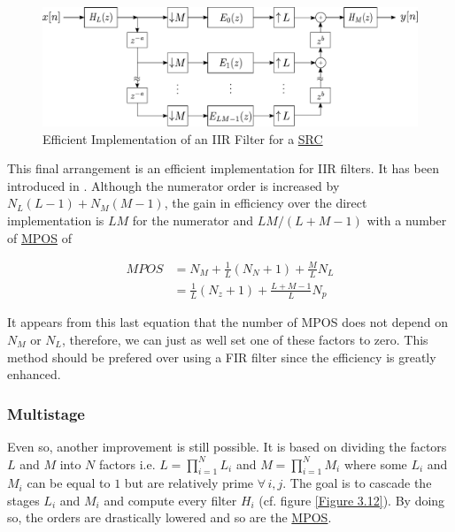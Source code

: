 \begin{figure}[ht!]
	\centering
	\includegraphics[scale = 0.7]{russell_final.pdf}
	\caption{Efficient Implementation of an IIR Filter for a \protect\hyperlink{SRC}{SRC}}
	\label{Figure 3.11}
\end{figure}


This final arrangement is an efficient implementation for IIR filters. It has been introduced in \cite{russell}. Although the numerator order is increased by $N_L(L-1) + N_M(M-1)$, the gain in efficiency over the direct implementation is $LM$ for the numerator and $LM/(L+M-1)$ with a number of \hyperlink{MPOS}{MPOS} of

\begin{equation}
	\begin{aligned}
	MPOS &= N_M + \frac{1}{L} (N_N+1) + \frac{M}{L} N_L \\
	&= \frac{1}{L} (N_z +1) + \frac{L+M-1}{L} N_p 
	\label{eqn:3.23}
	\end{aligned}
\end{equation}

It appears from this last equation that the number of MPOS does not depend on $N_M$ or $N_L$, therefore, we can just as well set one of these factors to zero. This method should be prefered over using a FIR filter since the efficiency is greatly enhanced. 


\subsubsection{Multistage}\label{3.1.4.2}

Even so, another improvement is still possible. It is based on dividing the factors $L$ and $M$ into $N$ factors i.e. $L = \prod_{i=1}^{N}L_i$ and $M=\prod_{i=1}^{N}M_i$ where some $L_i$ and $M_i$ can be equal to $1$ but are relatively prime $\forall \,  i,j$. The goal is to cascade the stages $L_i$ and $M_i$ and compute every filter $H_i$ (cf. figure \ref{Figure 3.12}). By doing so, the orders are drastically lowered and so are the \hyperlink{MPOS}{MPOS}. 

